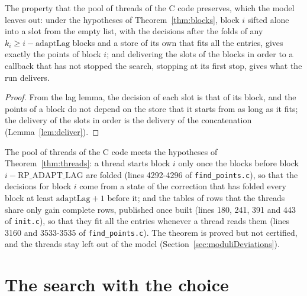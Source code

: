 \begin{theorem}\label{thm:threads}
  \leanok
  The property that the pool of threads of the C code preserves, which the model leaves out: under
  the hypotheses of Theorem~\ref{thm:blocks}, block $i$ sifted alone into a slot from the empty
  list, with the decisions after the folds of any $k_i \ge i - \mathrm{adaptLag}$ blocks and a store
  of its own that fits all the entries, gives exactly the points of block $i$; and delivering the
  slots of the blocks in order to a callback that has not stopped the search, stopping at its first
  stop, gives what the run delivers.
\end{theorem}

\begin{proof}
  \leanok
  From the lag lemma, the decision of each slot is that of its block, and the points of a block do
  not depend on the store that it starts from as long as it fits; the delivery of the slots in order
  is the delivery of the concatenation (Lemma~\ref{lem:deliver}).
\end{proof}

The pool of threads of the C code meets the hypotheses of Theorem~\ref{thm:threads}: a thread starts
block $i$ only once the blocks before block $i - \mathrm{RP\_ADAPT\_LAG}$ are folded (lines
4292-4296 of \verb|find_points.c|), so that the decisions for block $i$ come from a state of the
correction that has folded every block at least $\mathrm{adaptLag} + 1$ before it; and the tables of
rows that the threads share only gain complete rows, published once built (lines 180, 241, 391 and
443 of \verb|init.c|), so that they fit all the entries whenever a thread reads them (lines 3160 and
3533-3535 of \verb|find_points.c|). The theorem is proved but not certified, and the threads stay
left out of the model (Section~\ref{sec:moduliDeviations}).

\section{The search with the choice}\label{sec:choiceSearch}

